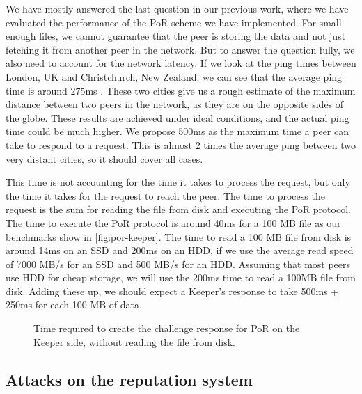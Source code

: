 We have mostly answered the last question in our previous work, where we have evaluated the performance of
the PoR scheme we have implemented.
For small enough files, we cannot guarantee that the peer is storing the data
and not just fetching it from another peer in the network.
But to answer the question fully, we also need to account for the network latency.
If we look at the ping times between London, UK and Christchurch, New Zealand,
we can see that the average ping time is around 275ms \cite{pingtimes}.
These two cities give us a rough estimate of the maximum distance between two peers in the network,
as they are on the opposite sides of the globe.
These results are achieved under ideal conditions, and the actual ping time could be much higher.
We propose 500ms as the maximum time a peer can take to respond to a request.
This is almost 2 times the average ping between two very distant cities, so it should cover all cases.

This time is not accounting for the time it takes to process the request, but only the time it takes for the
request to reach the peer.
The time to process the request is the sum for reading the file from disk and executing the PoR protocol.
The time to execute the PoR protocol is around 40ms for a 100 MB file as our benchmarks show in \autoref{fig:por-keeper}.
The time to read a 100 MB file from disk is around 14ms on an SSD and 200ms on an HDD, if we
use the average read speed of 7000 MB/s for an SSD and 500 MB/s for an HDD.
Assuming that most peers use HDD for cheap storage, we will use the 200ms time to read a 100MB file from disk.
Adding these up, we should expect a Keeper's response to take 500ms + 250ms for each 100 MB of data.

\begin{figure}
  \myfloatalign
  \caption[]{Time required to create the challenge response for PoR on the Keeper side, without reading the file from disk.}
  \label{fig:por-keeper}
\end{figure}

\subsection{Attacks on the reputation system}

